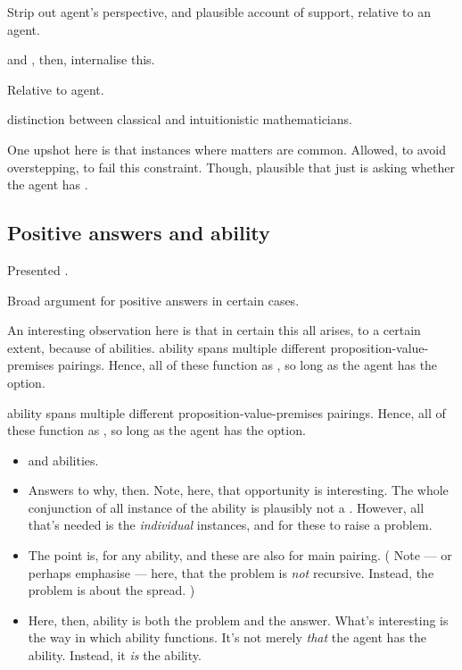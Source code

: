 \begin{note}
  \color{red}
  Strip out agent's perspective, and plausible account of support, relative to an agent.

  \zS{} and \qzS{}, then, internalise this.

  Relative to agent.

  distinction between classical and intuitionistic mathematicians.
\end{note}


\begin{note}
  One upshot here is that instances where \qzS{} matters are common.
  Allowed, to avoid overstepping, \support{} to fail this constraint.
  Though, plausible that \qzS{} just is asking whether the agent has \support{}.
\end{note}

\subsection{Positive answers and ability}
\label{sec:posit-answ-abil}

\begin{note}
  Presented .

  Broad argument for positive answers in certain cases.
\end{note}

\begin{note}
  An interesting observation here is that in certain this all arises, to a certain extent, because of \abgen{} abilities.
   ability spans multiple different proposition-value-premises pairings.
  Hence, all of these function as , so long as the agent has the option.

   ability spans multiple different proposition-value-premises pairings.
  Hence, all of these function as , so long as the agent has the option.

  \begin{itemize}
  \item
     and \abspec{} abilities.
  \item
    Answers to why, then.
    Note, here, that opportunity is interesting.
    The whole conjunction of all instance of the \abgen{} ability is plausibly not a \requ{}.
    However, all that's needed is the \emph{individual} instances, and for these to raise a problem.
  \item
    The point is,  for any \abgen{} ability, and these are also  for main pairing.
    (%
    Note --- or perhaps emphasise --- here, that the problem is \emph{not} recursive.
    Instead, the problem is about the spread.%
    )
  \item
    Here, then, ability is both the problem and the answer.
    What's interesting is the way in which ability functions.
    It's not merely \emph{that} the agent has the ability.
    Instead, it \emph{is} the ability.
  \end{itemize}
\end{note}

